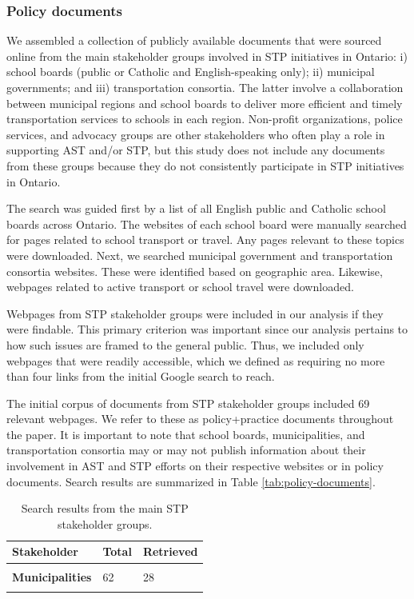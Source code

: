 \documentclass[preprint, 3p,
authoryear]{elsarticle} %
\begin{document}
\hypertarget{policy-documents}{%
\subsubsection{Policy documents}\label{policy-documents}}

We assembled a collection of publicly available documents that were
sourced online from the main stakeholder groups involved in STP
initiatives in Ontario: i) school boards (public or Catholic and
English-speaking only); ii) municipal governments; and iii)
transportation consortia. The latter involve a collaboration between
municipal regions and school boards to deliver more efficient and timely
transportation services to schools in each region. Non-profit
organizations, police services, and advocacy groups are other
stakeholders who often play a role in supporting AST and/or STP, but
this study does not include any documents from these groups because they
do not consistently participate in STP initiatives in Ontario.

The search was guided first by a list of all English public and Catholic
school boards across Ontario. The websites of each school board were
manually searched for pages related to school transport or travel. Any
pages relevant to these topics were downloaded. Next, we searched
municipal government and transportation consortia websites. These were
identified based on geographic area. Likewise, webpages related to
active transport or school travel were downloaded.

Webpages from STP stakeholder groups were included in our analysis if
they were findable. This primary criterion was important since our
analysis pertains to how such issues are framed to the general public.
Thus, we included only webpages that were readily accessible, which we
defined as requiring no more than four links from the initial Google
search to reach.

The initial corpus of documents from STP stakeholder groups included 69
relevant webpages. We refer to these as policy+practice documents
throughout the paper. It is important to note that school boards,
municipalities, and transportation consortia may or may not publish
information about their involvement in AST and STP efforts on their
respective websites or in policy documents. Search results are
summarized in Table \ref{tab:policy-documents}.

\begin{table}

\caption{\label{tab:policy-documents}\label{tab:search-results}Search results from the main STP stakeholder groups.}
\centering
\begin{tabular}[t]{>{}l|l|>{}l}
\toprule
Stakeholder & Total & Retrieved\\
\midrule
\cellcolor{gray!6}{\textbf{School boards}} & \cellcolor{gray!6}{62} & \cellcolor{gray!6}{32}\\
\textbf{Municipalities} & 62 & 28\\
\cellcolor{gray!6}{\textbf{Transportation consortia}} & \cellcolor{gray!6}{39} & \cellcolor{gray!6}{9}\\
\bottomrule
\end{tabular}
\end{table}
\end{document}
